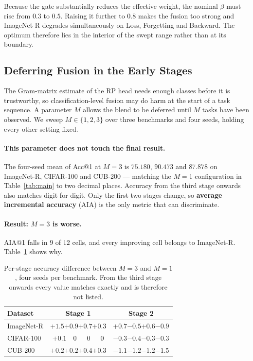 \documentclass[11pt,a4paper]{article}
\begin{document}
Because the gate substantially reduces the effective weight, the nominal $\beta$
must rise from $0.3$ to $0.5$. Raising it further to $0.8$ makes the fusion too
strong and ImageNet-R degrades simultaneously on Loss, Forgetting and Backward.
The optimum therefore lies in the interior of the swept range rather than at its
boundary.

\subsection{Deferring Fusion in the Early Stages}
\label{sec:mintasks}

The Gram-matrix estimate of the RP head needs enough classes before it is
trustworthy, so classification-level fusion may do harm at the start of a task
sequence. A parameter $M$ allows the blend to be deferred until $M$ tasks have
been observed. We sweep $M \in \{1, 2, 3\}$ over three benchmarks and four
seeds, holding every other setting fixed.

\paragraph{This parameter does not touch the final result.}
The four-seed mean of Acc@1 at $M = 3$ is $75.180$, $90.473$ and $87.878$ on
ImageNet-R, CIFAR-100 and CUB-200 --- matching the $M = 1$ configuration in
Table~\ref{tab:main} to two decimal places. Accuracy from the third stage
onwards also matches digit for digit. Only the first two stages change, so
\textbf{average incremental accuracy} (AIA) is the only metric that can
discriminate.

\paragraph{Result: $M = 3$ is worse.}
AIA@1 falls in $9$ of $12$ cells, and every improving cell belongs to
ImageNet-R. Table~\ref{tab:mintasks} shows why.

\begin{table}[H]
\centering
\caption{Per-stage accuracy difference between $M = 3$ and $M = 1$, four seeds
per benchmark. From the third stage onwards every value matches exactly and is
therefore not listed.}
\label{tab:mintasks}
\begin{tabular}{@{}lcc@{}}
\toprule
Dataset & Stage 1 & Stage 2 \\
\midrule
ImageNet-R & $+1.5$\quad $+0.9$\quad $+0.7$\quad $+0.3$
           & $+0.7$\quad $-0.5$\quad $+0.6$\quad $-0.9$ \\
CIFAR-100  & $+0.1$\quad\ \ $0$\quad\ \ \ $0$\quad\ \ \ $0$
           & $-0.3$\quad $-0.4$\quad $-0.3$\quad $-0.3$ \\
CUB-200    & $+0.2$\quad $+0.2$\quad $+0.4$\quad $+0.3$
           & $-1.1$\quad $-1.2$\quad $-1.2$\quad $-1.5$ \\
\bottomrule
\end{tabular}
\end{table}
\end{document}
